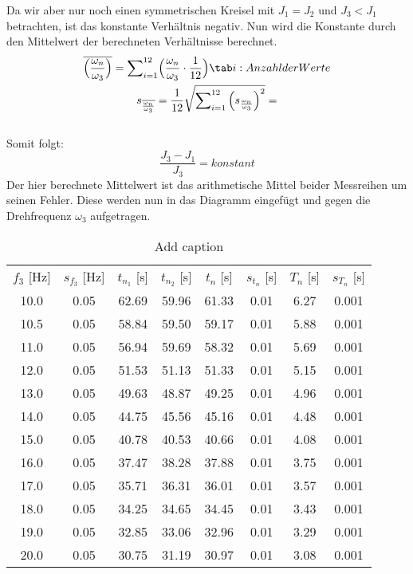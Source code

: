 Da wir aber nur noch einen symmetrischen Kreisel mit $J_1 = J_2$ und $J_3<J_1$ betrachten, ist das konstante Verh\"altnis  negativ. Nun wird die Konstante durch den Mittelwert der berechneten Verh\"altnisse berechnet.
\begin{gather}   
    \overline{\Bigl(\frac{\omega_n}{\omega_3}\Bigr)} = \sum\nolimits_{i=1}^{12}\Bigl(\frac{\omega_n}{\omega_3}\cdot{\frac{1}{12}}\Bigr) \tab i: Anzahl der Werte\\
    s_{\overline{\frac{\omega_n}{\omega_3}} }= \frac{1}{12}\sqrt{\sum\nolimits_{i=1}^{12}{\Bigl(s_{\frac{\omega_n}{\omega_3}}\Bigr)}^2}=
\end{gather} \\
Somit folgt: 
\begin{equation}
    \frac{J_3-J_1}{J_3}= konstant
\end{equation}
Der hier berechnete Mittelwert ist das arithmetische Mittel beider Messreihen um seinen Fehler. Diese werden nun in das Diagramm eingef\"ugt und gegen die Drehfrequenz $\omega_3$ aufgetragen. 

\begin{table}[htbp]
    \centering
      \begin{tabular}{cccccccc}
      \rowcolor[rgb]{ .741,  .843,  .933} $f_3$ [Hz] & $s_{f_3}$ [Hz] & $t_{n_1}$ [s] & $t_{n_2}$ [s] & $t_n$ [s] & $s_{t_n}$ [s] & $T_n$ [s] & $s_{T_n}$ [s] \\
      10.0  & 0.05  & 62.69 & 59.96 & 61.33 & 0.01  & 6.27  & 0.001 \\
      10.5  & 0.05  & 58.84 & 59.50 & 59.17 & 0.01  & 5.88  & 0.001 \\
      11.0  & 0.05  & 56.94 & 59.69 & 58.32 & 0.01  & 5.69  & 0.001 \\
      12.0  & 0.05  & 51.53 & 51.13 & 51.33 & 0.01  & 5.15  & 0.001 \\
      13.0  & 0.05  & 49.63 & 48.87 & 49.25 & 0.01  & 4.96  & 0.001 \\
      14.0  & 0.05  & 44.75 & 45.56 & 45.16 & 0.01  & 4.48  & 0.001 \\
      15.0  & 0.05  & 40.78 & 40.53 & 40.66 & 0.01  & 4.08  & 0.001 \\
      16.0  & 0.05  & 37.47 & 38.28 & 37.88 & 0.01  & 3.75  & 0.001 \\
      17.0  & 0.05  & 35.71 & 36.31 & 36.01 & 0.01  & 3.57  & 0.001 \\
      18.0  & 0.05  & 34.25 & 34.65 & 34.45 & 0.01  & 3.43  & 0.001 \\
      19.0  & 0.05  & 32.85 & 33.06 & 32.96 & 0.01  & 3.29  & 0.001 \\
      20.0  & 0.05  & 30.75 & 31.19 & 30.97 & 0.01  & 3.08  & 0.001 \\
      \end{tabular}%
    \label{tab:addlabels}%
    \caption{Add caption}
\end{table}%

